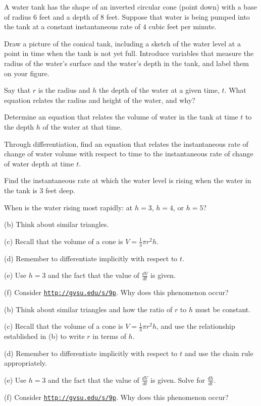 \begin{activity} \label{A:3.1.1} A water tank has the shape of an inverted circular cone (point down) with a base of radius $6$ feet and a depth of $8$ feet.  Suppose that water is being pumped into the tank at a constant instantaneous rate of $4$ cubic feet per minute.
\ba
	\item Draw a picture of the conical tank, including a sketch of the water level at a point in time when the tank is not yet full.  Introduce variables that measure the radius of the water's surface and the water's depth in the tank, and label them on your figure.
	\item Say that $r$ is the radius and $h$ the depth of the water at a given time, $t$.  What equation relates the radius and height of the water, and why?
	\item Determine an equation that relates the volume of water in the tank at time $t$ to the depth $h$ of the water at that time.
	\item Through differentiation, find an equation that relates the instantaneous rate of change of water volume with respect to time to the instantaneous rate of change of water depth at time $t$.
	\item Find the instantaneous rate at which the water level is rising when the water in the tank is $3$ feet deep.
	\item When is the water rising most rapidly:  at $h = 3$, $h = 4$, or $h = 5$?
\ea
\end{activity}
\begin{smallhint}
\ba
	\item[(b)] Think about similar triangles.
	\item[(c)] Recall that the volume of a cone is $V = \frac{1}{3} \pi r^2 h$.
	\item[(d)] Remember to differentiate implicitly with respect to $t$.
	\item[(e)] Use $h = 3$ and the fact that the value of $\frac{dV}{dt}$ is given.
	\item[(f)] Consider \href{http://gvsu.edu/s/9p}{\texttt{http://gvsu.edu/s/9p}}.  Why does this phenomenon occur?
\ea
\end{smallhint}
\begin{bighint}
\ba
	\item[(b)] Think about similar triangles and how the ratio of $r$ to $h$ must be constant.
	\item[(c)] Recall that the volume of a cone is $V = \frac{1}{3} \pi r^2 h$, and use the relationship established in (b) to write $r$ in terms of $h$.
	\item[(d)] Remember to differentiate implicitly with respect to $t$ and use the chain rule appropriately.
	\item[(e)] Use $h = 3$ and the fact that the value of $\frac{dV}{dt}$ is given.  Solve for $\frac{dh}{dt}$.
	\item[(f)] Consider \href{http://gvsu.edu/s/9p}{\texttt{http://gvsu.edu/s/9p}}.  Why does this phenomenon occur?
\ea
\end{bighint}
